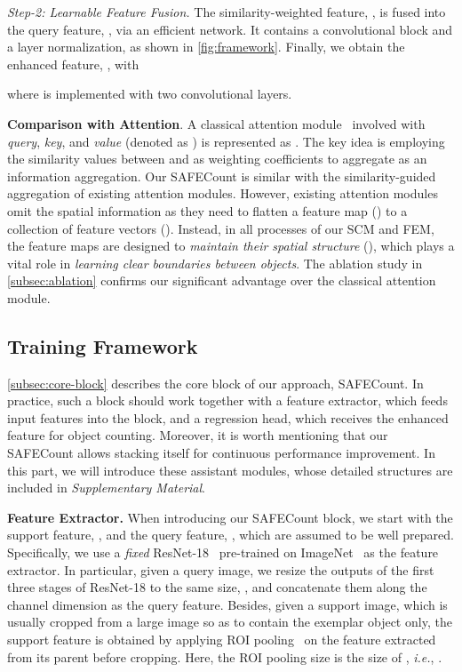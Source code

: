 \documentclass[10pt,twocolumn,letterpaper]{article}
\newcommand{\method}{SAFECount\xspace}
\newcommand{\supp}{\textit{Supplementary Material}\xspace}
\begin{document}
\textit{Step-2: Learnable Feature Fusion.}
The similarity-weighted feature, , is fused into the query feature, , via an efficient network.
It contains a convolutional block and a layer normalization, as shown in \cref{fig:framework}.
Finally, we obtain the enhanced feature, , with

where  is implemented with two convolutional layers. 



\vspace{2pt} \noindent \textbf{Comparison with Attention}. A classical attention module~\cite{attention_need} involved with \textit{query}, \textit{key}, and \textit{value} (denoted as ) is represented as . 
The key idea is employing the similarity values between  and  as weighting coefficients to aggregate  as an information aggregation. Our \method is similar with the similarity-guided aggregation of existing attention modules. 
However, existing attention modules omit the spatial information as they need to flatten a feature map () to a collection of feature vectors (). Instead, in all processes of our SCM and FEM, the feature maps are designed to \textit{maintain their spatial structure} (), which plays a vital role in \textit{learning clear boundaries between objects}. 
The ablation study in \cref{subsec:ablation} confirms our significant advantage over the classical attention module. 


\subsection{Training Framework}\label{subsec:framework}


\cref{subsec:core-block} describes the core block of our approach, \method.
In practice, such a block should work together with a feature extractor, which feeds input features into the block, and a regression head, which receives the enhanced feature for object counting.
Moreover, it is worth mentioning that our \method allows stacking itself for continuous performance improvement.
In this part, we will introduce these assistant modules, whose detailed structures are included in \supp.


\vspace{2pt}\noindent\textbf{Feature Extractor.}
When introducing our \method block, we start with the support feature, , and the query feature, , which are assumed to be well prepared.
Specifically, we use a \textit{fixed} ResNet-18~\cite{resnet} pre-trained on ImageNet~\cite{imagenet} as the feature extractor.
In particular, given a query image, we resize the outputs of the first three stages of ResNet-18 to the same size, , and concatenate them along the channel dimension as the query feature.
Besides, given a support image, which is usually cropped from a large image so as to contain the exemplar object only, the support feature is obtained by applying ROI pooling~\cite{faster_rcnn} on the feature extracted from its parent before cropping.
Here, the ROI pooling size is the size of , \textit{i.e.}, .
\end{document}
